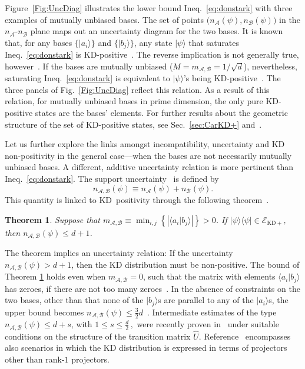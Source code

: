 \documentclass[%
 reprint,
superscriptaddress,
nofootinbib,
bibnotes,
 amsmath,amssymb,
 aps,
]{revtex4-1}
\theoremstyle{plain}
\newcommand*{\ketbra}[2]{\lvert #1 \rangle\!\langle #2 \rvert}
\newcommand{\bracket}[2]{\langle #1|#2\rangle}
\newcommand{\Acal}{{\mathcal A}}
\newcommand{\Bcal}{{\mathcal B}}
\newcommand{\EcalKDC}{{\mathcal E}_{\mathrm{KD+}}}
\newcommand{\nab}{n_{\Acal,\Bcal}}
\newcommand{\na}{n_{\Acal}}
\newcommand{\nb}{n_{\Bcal}}
\newcommand{\mab}{m_{\Acal,\Bcal}}
\newtheorem{Theorem}{Theorem}[section]
\begin{document}
Figure~\ref{Fig:UncDiag} illustrates the lower bound Ineq.~\eqref{eq:donstark} with three examples of mutually unbiased bases.  
The set of points $\bm{(} \na(\psi), \nb(\psi) \bm{)}$ in the  $\na$-$\nb$ plane maps out an uncertainty diagram for the two bases. It is known that, for any bases $\{ |a_i\rangle \} $ and $\{ |b_j\rangle \}$, any state $|\psi\rangle$ that saturates Ineq.~\eqref{eq:donstark} is KD-positive~\cite{DeBievre2021}. The reverse implication is not generally true, however~\cite{DeBievre2021}. If the bases are mutually unbiased ($M = \mab = 1 / \sqrt{d}$), nevertheless, saturating Ineq.~\eqref{eq:donstark} is equivalent to $|\psi\rangle$'s being KD-positive~\cite{Xu2021}. 
The three panels of Fig.~\ref{Fig:UncDiag} reflect this relation.
As a result of this relation, 
for mutually unbiased bases in prime dimension, the only pure KD-positive states are 
the bases' elements. For further results about the geometric structure of the set of KD-positive states, see Sec.~\ref{sec:CarKD+} and~\cite{langrenez2023characterizing}.


Let us further explore the links amongst incompatibility, uncertainty and KD non-positivity in the general case---when the bases are not necessarily mutually unbiased bases. A different, additive uncertainty relation is more pertinent than Ineq.~\eqref{eq:donstark}.
The support uncertainty~\cite{DeBievre2021} is defined by
\begin{equation}\label{eq:def}
\nab (\psi) \equiv n_{\Acal}(\psi) + n_{\Bcal}(\psi).
\end{equation}
This quantity is linked to KD~positivity through the following theorem~\cite{DeBievre2021}.
\begin{Theorem}\label{thm:supuncpure}
Suppose that $\mab \equiv \min_{i,j} \left\{ \left|\bracket{a_i}{b_j}\right|  \right\} > 0$. If $\ketbra{\psi}{\psi}\in\EcalKDC$, then $\nab (\psi) \leqslant d+1$. 
\end{Theorem}
The theorem implies an uncertainty relation: If the uncertainty $\nab (\psi) > d+1$, then the KD distribution must be non-positive. 
The bound of Theorem \ref{thm:supuncpure} holds even when $\mab=0$, such that the matrix with elements $\bracket{a_i}{b_j}$ has zeroes, if there are not too many zeroes~\cite{DeBievre2021}.   In the absence of constraints on the two bases, other than that none of the $|b_j\rangle$s are parallel to any of the $|a_i\rangle$s, 
the upper bound becomes $\nab (\psi) \leqslant \frac32 d$~\cite{ArvidssonShukur2021}. Intermediate estimates of the type  $\nab (\psi) \leqslant  d+s$, with $1\leq s\leq \frac{d}2 \, ,$ were recently proven  in~\cite{xu2022a} under suitable conditions on the structure of the transition matrix $\hat U$. Reference~\cite{ArvidssonShukur2021} encompasses also scenarios in which the KD distribution is expressed in terms of  projectors other than rank-$1$ projectors.
\end{document}

